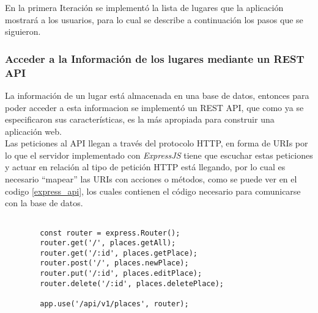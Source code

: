 %
%
%
%

En la primera Iteración se implementó la lista de lugares que la aplicación mostrará a los usuarios, para lo cual se describe a continuación los pasos que se siguieron. \\


\subsubsection{Acceder a la Información de los lugares mediante un REST API }


La información de un lugar está almacenada en una base de datos, entonces para poder acceder a esta informacion se implement\'o un REST API, que como ya se especificaron sus características, es la más apropiada para construir una aplicación web. \\

Las peticiones al API llegan a través del protocolo HTTP, en forma de URIs por lo que el servidor implementado con \emph{ExpressJS} tiene que escuchar estas peticiones y actuar en relación al tipo de petición HTTP está llegando, por lo cual es necesario ``mapear'' las URIs con acciones o métodos, como se puede ver en el codigo \ref{express_api}, los cuales contienen el código necesario para comunicarse con la base de datos. \\


\begin{center}
  \begin{lstlisting}[label=express_api,caption=Declarando API REST con ExpressJS]

        const router = express.Router();
        router.get('/', places.getAll);
        router.get('/:id', places.getPlace);
        router.post('/', places.newPlace);
        router.put('/:id', places.editPlace);
        router.delete('/:id', places.deletePlace);

        app.use('/api/v1/places', router);

  \end{lstlisting}
\end{center}


